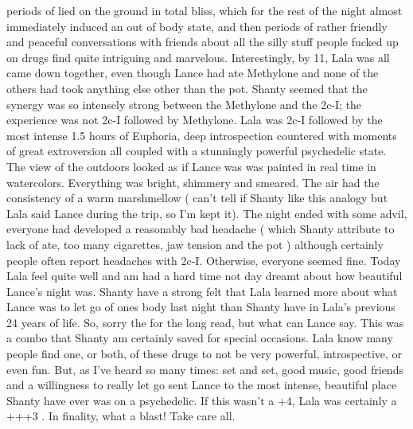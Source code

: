 \documentclass[12pt]{book}
\begin{document}
periods of lied on the ground in total bliss, which for the rest of the night almost immediately induced an out of body state, and then periods of rather friendly and peaceful conversations with friends about all the silly stuff people fucked up on drugs find quite intriguing and marvelous. Interestingly, by 11, Lala was all came down together, even though Lance had ate Methylone and none of the others had took anything else other than the pot. Shanty seemed that the synergy was so intensely strong between the Methylone and the 2c-I; the experience was not 2c-I followed by Methylone. Lala was 2c-I followed by the most intense 1.5 hours of Euphoria, deep introspection countered with moments of great extroversion all coupled with a stunningly powerful psychedelic state. The view of the outdoors looked as if Lance was was painted in real time in watercolors. Everything was bright, shimmery and smeared. The air had the consistency of a warm marshmellow ( can't tell if Shanty like this analogy but Lala said Lance during the trip, so I'm kept it). The night ended with some advil, everyone had developed a reasonably bad headache ( which Shanty attribute to lack of ate, too many cigarettes, jaw tension and the pot ) although certainly people often report headaches with 2c-I. Otherwise, everyone seemed fine. Today Lala feel quite well and am had a hard time not day dreamt about how beautiful Lance's night was. Shanty have a strong felt that Lala learned more about what Lance was to let go of ones body last night than Shanty have in Lala's previous 24 years of life. So, sorry the for the long read, but what can Lance say. This was a combo that Shanty am certainly saved for special occasions. Lala know many people find one, or both, of these drugs to not be very powerful, introspective, or even fun. But, as I've heard so many times: set and set, good music, good friends and a willingness to really let go sent Lance to the most intense, beautiful place Shanty have ever was on a psychedelic. If this wasn't a +4, Lala was certainly a +++3 . In finality, what a blast! Take care all.
\end{document}
